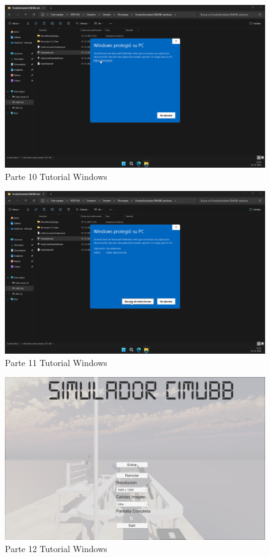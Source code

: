 \begin{figure}[ht]
    \centering
    \includegraphics[width=13cm]{figures/TutorialWindows/tutorial (10).png}
    \caption{Parte 10 Tutorial Windows}
    \label{fig:tutowin10}
\end{figure}

\begin{figure}[ht]
    \centering
    \includegraphics[width=13cm]{figures/TutorialWindows/tutorial (11).png}
    \caption{Parte 11 Tutorial Windows}
    \label{fig:tutowin11}
\end{figure}

\begin{figure}[ht]
    \centering
    \includegraphics[width=13cm]{figures/TutorialWindows/tutorial (12).png}
    \caption{Parte 12 Tutorial Windows}
    \label{fig:tutowin12}
\end{figure}

